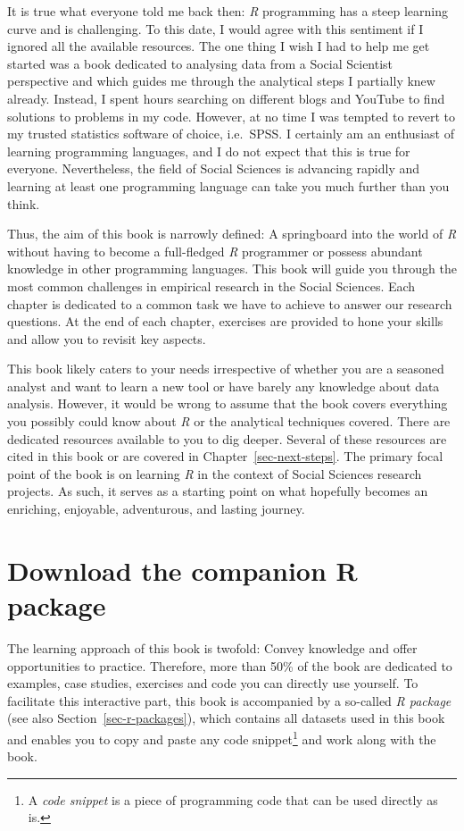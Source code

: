 \documentclass[
  letterpaper,
  DIV=11,
  numbers=noendperiod]{scrreprt}
\begin{document}
It is true what everyone told me back then: \emph{R} programming has a
steep learning curve and is challenging. To this date, I would agree
with this sentiment if I ignored all the available resources. The one
thing I wish I had to help me get started was a book dedicated to
analysing data from a Social Scientist perspective and which guides me
through the analytical steps I partially knew already. Instead, I spent
hours searching on different blogs and YouTube to find solutions to
problems in my code. However, at no time I was tempted to revert to my
trusted statistics software of choice, i.e.~SPSS. I certainly am an
enthusiast of learning programming languages, and I do not expect that
this is true for everyone. Nevertheless, the field of Social Sciences is
advancing rapidly and learning at least one programming language can
take you much further than you think.

Thus, the aim of this book is narrowly defined: A springboard into the
world of \emph{R} without having to become a full-fledged \emph{R}
programmer or possess abundant knowledge in other programming languages.
This book will guide you through the most common challenges in empirical
research in the Social Sciences. Each chapter is dedicated to a common
task we have to achieve to answer our research questions. At the end of
each chapter, exercises are provided to hone your skills and allow you
to revisit key aspects.

This book likely caters to your needs irrespective of whether you are a
seasoned analyst and want to learn a new tool or have barely any
knowledge about data analysis. However, it would be wrong to assume that
the book covers everything you possibly could know about \emph{R} or the
analytical techniques covered. There are dedicated resources available
to you to dig deeper. Several of these resources are cited in this book
or are covered in Chapter~\ref{sec-next-steps}. The primary focal point
of the book is on learning \emph{R} in the context of Social Sciences
research projects. As such, it serves as a starting point on what
hopefully becomes an enriching, enjoyable, adventurous, and lasting
journey.

\section{Download the companion R
package}\label{sec-download-the-companion-r-package}

The learning approach of this book is twofold: Convey knowledge and
offer opportunities to practice. Therefore, more than 50\% of the book
are dedicated to examples, case studies, exercises and code you can
directly use yourself. To facilitate this interactive part, this book is
accompanied by a so-called \emph{R package} (see also
Section~\ref{sec-r-packages}), which contains all datasets used in this
book and enables you to copy and paste any code snippet\footnote{A
  \emph{code snippet} is a piece of programming code that can be used
  directly as is.} and work along with the book.
\end{document}
